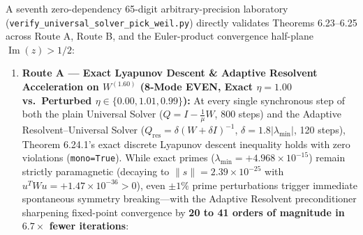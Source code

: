 \documentclass[
  11pt,
]{article}
\begin{document}
A seventh zero-dependency 65-digit arbitrary-precision laboratory
(\texttt{verify\_universal\_solver\_pick\_weil.py}) directly validates
Theorems 6.23--6.25 across Route A, Route B, and the Euler-product
convergence half-plane \(\operatorname{Im}(z) > 1/2\):

\begin{enumerate}
\def\labelenumi{\arabic{enumi}.}
\item
  \textbf{Route A --- Exact Lyapunov Descent \& Adaptive Resolvent
  Acceleration on \(W^{(1.60)}\) (8-Mode EVEN, Exact \(\eta = 1.00\)
  vs.~Perturbed \(\eta \in \{0.00, 1.01, 0.99\}\)):} At every single
  synchronous step of both the plain Universal Solver
  (\(Q = I - \frac{1}{\mu}W\), 800 steps) and the Adaptive
  Resolvent--Universal Solver
  (\(Q_{\text{res}} = \delta(W + \delta I)^{-1}\),
  \(\delta = 1.8|\lambda_{\min}|\), 120 steps), Theorem 6.24.1's exact
  discrete Lyapunov descent inequality holds with zero violations
  (\texttt{mono=True}). While exact primes
  (\(\lambda_{\min} = +4.968 \times 10^{-15}\)) remain strictly
  paramagnetic (decaying to \(\|s\| = 2.39 \times 10^{-25}\) with
  \(u^T W u = +1.47 \times 10^{-36} > 0\)), even \(\pm 1\%\) prime
  perturbations trigger immediate spontaneous symmetry breaking---with
  the Adaptive Resolvent preconditioner sharpening fixed-point
  convergence by \textbf{20 to 41 orders of magnitude in \(6.7\times\)
  fewer iterations}:


\end{enumerate}
\end{document}
